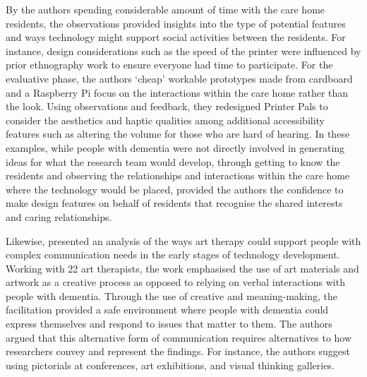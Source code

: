By the authors spending considerable amount of time with the care home residents, the observations provided insights into the type of potential features and ways technology might support social activities between the residents. For instance, design considerations such as the speed of the printer were influenced by prior ethnography work to ensure everyone had time to participate. For the evaluative phase, the authors `cheap' workable prototypes made from cardboard and a Raspberry Pi focus on the interactions within the care home rather than the look. Using observations and feedback, they redesigned Printer Pals to consider the aesthetics and haptic qualities among additional accessibility features such as altering the volume for those who are hard of hearing. In these examples, while people with dementia were not directly involved in generating ideas for what the research team would develop, through getting to know the residents and observing the relationships and interactions within the care home where the technology would be placed, provided the authors the confidence to make design features on behalf of residents that recognise the shared interests and caring relationships.

Likewise, \cite{lazar2018making} presented an analysis of the ways art therapy could support people with complex communication needs in the early stages of technology development. Working with 22 art therapists, the work emphasised the use of art materials and artwork as a creative process as opposed to relying on verbal interactions with people with dementia. Through the use of creative and meaning-making, the facilitation provided a safe environment where people with dementia could express themselves and respond to issues that matter to them. The authors argued that this alternative form of communication requires alternatives to how researchers convey and represent the findings. For instance, the authors suggest using pictorials at conferences, art exhibitions, and visual thinking galleries.


